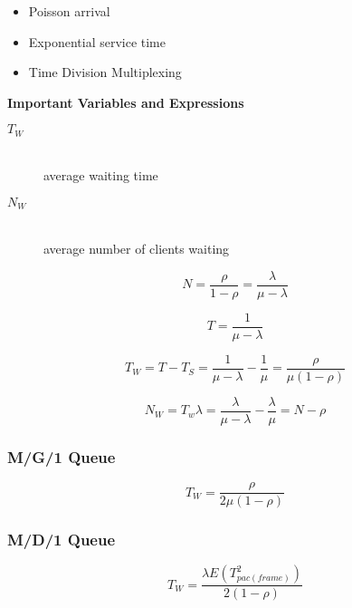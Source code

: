 \documentclass[../resumosRCOM.tex]{subfiles}
\begin{document}
\begin{itemize}
    \item Poisson arrival
    \item Exponential service time
    \item Time Division Multiplexing
\end{itemize}

\textbf{Important Variables and Expressions}
\begin{description}
    \item[\(T_{W}\)] \hfill \\ average waiting time
    \item[\(N_{W}\)] \hfill \\ average number of clients waiting
\end{description}

\begin{equation}
    N = \frac{\rho}{1-\rho} = \frac{\lambda}{\mu-\lambda}
\end{equation}

\begin{equation}
    T = \frac{1}{\mu-\lambda}
\end{equation}

\begin{equation}
    T_{W} = T - T_{S} = \frac{1}{\mu-\lambda} - \frac{1}{\mu} = \frac{\rho}{\mu(1-\rho)}
\end{equation}

\begin{equation}
    N_{W} = T_{w}\lambda = \frac{\lambda}{\mu-\lambda} - \frac{\lambda}{\mu} = N - \rho
\end{equation}

\subsubsection{M/G/1 Queue}

\begin{equation}
    T_{W} = \frac{\rho}{2\mu(1-\rho)}
\end{equation}

\subsubsection{M/D/1 Queue}

\begin{equation}
    T_{W} = \frac{\lambda E(T_{pac(frame)}^2)}{2(1-\rho)}
\end{equation}
\end{document}
